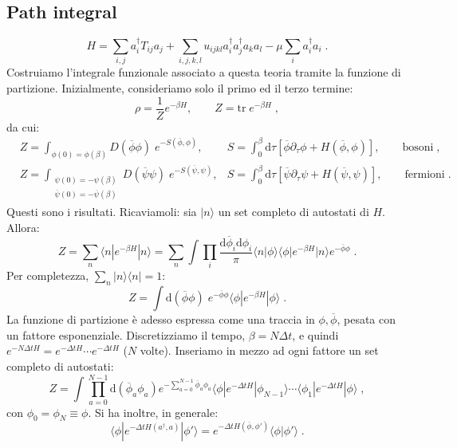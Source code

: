 \documentclass[12pt,a4paper]{article}
\theoremstyle{definition}
\numberwithin{equation}{section}
\newcommand{\diff}[1][]{\mathrm{d}#1}
\newcommand{\bra}{\langle}
\newcommand{\ket}{\rangle}
\newcommand{\adj}[1]{#1^{\dagger}}
\newcommand{\tr}{\mathrm{tr}}
\begin{document}
\subsection{Path integral}
\begin{equation}
H=\sum_{i,j}\adj{a}_iT_{ij}a_j+\sum_{i,j,k,l}u_{ijkl}\adj{a}_i\adj{a}_ja_ka_l-\mu\sum_i\adj{a}_ia_i\;.
\end{equation}
Costruiamo l'integrale funzionale associato a questa teoria tramite la funzione di partizione. Inizialmente, consideriamo solo il primo ed il terzo termine:
$$
\rho=\frac{1}{Z}e^{-\beta H},\qquad Z=\tr\; e^{-\beta H}\;,
$$
da cui:
\begin{align}
&Z=\int_{\phi(0)=\phi(\beta)}D(\overline{\phi}\phi)\; e^{-S(\overline{\phi},\phi)}, & S=\int_0^{\beta}\diff{\tau}[\overline{\phi}\partial_{\tau}\phi+H(\overline{\phi},\phi)], \qquad\mbox{bosoni}\;, \label{sec4_bosons}\\
&Z=\int_{\substack{\psi(0)=-\psi(\beta) \\ \overline{\psi}(0)=-\overline{\psi}(\beta)}}D(\overline{\psi}\psi)\;e^{-S(\overline{\psi},\psi)}, & S=\int_0^{\beta}\diff{\tau}[\overline{\psi}\partial_{\tau}\psi+H(\overline{\psi},\psi)], \qquad \mbox{fermioni}\;. \label{sec4_fermions}
\end{align}
Questi sono i risultati. Ricaviamoli: sia $|n\ket$ un set completo di autostati di $H$. Allora:
$$
Z=\sum_n\bra n|e^{-\beta H}|n\ket=\sum_n\int\prod_i\frac{\diff{\overline{\phi}_i}\diff{\phi_i}}{\pi}\bra n|\phi\ket\bra\phi|e^{-\beta H}|n\ket e^{-\overline{\phi}\phi}\;.
$$
Per completezza, $\sum_n |n\ket\bra n|=1$:
\begin{equation}
Z=\int\diff{(\overline{\phi}\phi)}\;e^{-\overline{\phi}\phi}\bra \phi|e^{-\beta H}|\phi\ket\;.
\end{equation}
La funzione di partizione è adesso espressa come una traccia in $\phi,\overline{\phi}$, pesata con un fattore esponenziale. Discretizziamo il tempo, $\beta=N\Delta t$, e quindi $e^{-N\Delta tH}=e^{-\Delta t H}\cdots e^{-\Delta t H}$ ($N$ volte). Inseriamo in mezzo ad ogni fattore un set completo di autostati:
$$
Z=\int\prod_{a=0}^{N-1}\diff{(\overline{\phi}_a\phi_a)}e^{-\sum_{a=0}^{N-1}\overline{\phi}_a\phi_a}\bra\phi|e^{-\Delta t H}|\phi_{N-1}\ket\cdots\bra \phi_1|e^{-\Delta t H}|\phi\ket\;,
$$
con $\phi_0=\phi_N\equiv\phi$. Si ha inoltre, in generale:
\begin{equation}
\bra\phi|e^{-\Delta t H(\adj{a},a)}|\phi'\ket=e^{-\Delta t H(\overline{\phi},\phi')}\bra\phi|\phi'\ket\;.
\end{equation}
\end{document}
